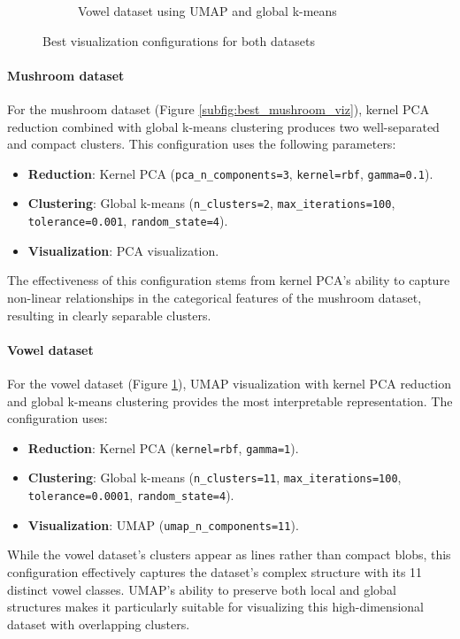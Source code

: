 \begin{figure}[h!]
\begin{subfigure}[b]{0.45\textwidth}
        \caption{Vowel dataset using UMAP and global k-means}
        \label{subfig:best_vowel_viz}
    \end{subfigure}
    
    \caption{Best visualization configurations for both datasets}
    \label{fig:best_visualizations}
\end{figure}

\paragraph{Mushroom dataset}
For the mushroom dataset (Figure \ref{subfig:best_mushroom_viz}), kernel PCA reduction combined with global k-means clustering produces two well-separated and compact clusters. This configuration uses the following parameters:
\begin{itemize}
    \item \textbf{Reduction}: Kernel PCA (\texttt{pca\_n\_components=3}, \texttt{kernel=rbf}, \texttt{gamma=0.1}).
    \item \textbf{Clustering}: Global k-means (\texttt{n\_clusters=2}, \texttt{max\_iterations=100}, \texttt{tolerance=0.001}, \texttt{random\_state=4}).
    \item \textbf{Visualization}: PCA visualization.
\end{itemize}


The effectiveness of this configuration stems from kernel PCA's ability to capture non-linear relationships in the categorical features of the mushroom dataset, resulting in clearly separable clusters.

\paragraph{Vowel dataset}
For the vowel dataset (Figure \ref{subfig:best_vowel_viz}), UMAP visualization with kernel PCA reduction and global k-means clustering provides the most interpretable representation. The configuration uses:
\begin{itemize}
    \item \textbf{Reduction}: Kernel PCA (\texttt{kernel=rbf}, \texttt{gamma=1}).
    \item \textbf{Clustering}: Global k-means (\texttt{n\_clusters=11}, \texttt{max\_iterations=100}, \texttt{tolerance=0.0001}, \texttt{random\_state=4}).
    \item \textbf{Visualization}: UMAP (\texttt{umap\_n\_components=11}).
\end{itemize}


While the vowel dataset's clusters appear as lines rather than compact blobs, this configuration effectively captures the dataset's complex structure with its 11 distinct vowel classes. UMAP's ability to preserve both local and global structures makes it particularly suitable for visualizing this high-dimensional dataset with overlapping clusters.
